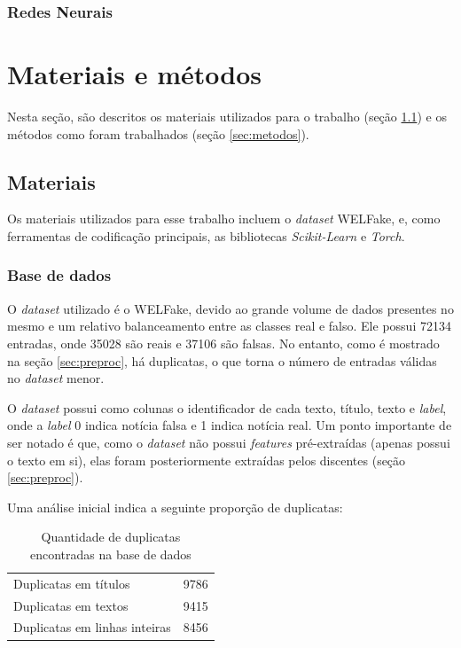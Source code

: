 \documentclass[12pt]{article}
\begin{document}
\subsubsection{Redes Neurais}

\section{Materiais e métodos}

	Nesta seção, são descritos os materiais utilizados para o trabalho (seção \ref{sec:materiais}) e os métodos como foram trabalhados (seção \ref{sec:metodos}).
	
\subsection{Materiais} \label{sec:materiais}

Os materiais utilizados para esse trabalho incluem o \textit{dataset} WELFake, e, como ferramentas de codificação principais, as bibliotecas \textit{Scikit-Learn} e \textit{Torch}.

\subsubsection{Base de dados}

O \textit{dataset} utilizado é o WELFake, devido ao grande volume de dados presentes no mesmo e um relativo balanceamento entre as classes real e falso. Ele possui 72134 entradas, onde 35028 são reais e 37106 são falsas. No entanto, como é mostrado na seção \ref{sec:preproc}, há duplicatas, o que torna o número de entradas válidas no \textit{dataset} menor.

O \textit{dataset} possui como colunas o identificador de cada texto, título, texto e \textit{label}, onde a \textit{label} 0 indica notícia falsa e 1 indica notícia real. Um ponto importante de ser notado é que, como o \textit{dataset} não possui \textit{features} pré-extraídas (apenas possui o texto em si), elas foram posteriormente extraídas pelos discentes (seção \ref{sec:preproc}).

Uma análise inicial indica a seguinte proporção de duplicatas:

\begin{table}[h]
	\centering
	\begin{tabular}{|l|c|}
		\hline
		Duplicatas em títulos & 9786 \\
		Duplicatas em textos & 9415 \\
		Duplicatas em linhas inteiras & 8456 \\
		\hline
	\end{tabular}
	\label{tab:duplicatas}
	\caption{Quantidade de duplicatas encontradas na base de dados}
\end{table}
\end{document}

